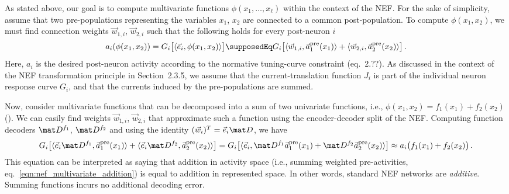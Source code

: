 As stated above, our goal is to compute multivariate functions $\phi(x_1, \ldots, x_\ell)$ within the context of the NEF.
For the sake of simplicity, assume that two pre-populations representing the variables $x_1$, $x_2$ are connected to a common post-population.
To compute $\phi(x_1, x_2)$, we must find connection weights $\vec w_{1, i}$, $\vec w_{2, i}$ such that the following holds for every post-neuron $i$
\begin{align}
	a_i(\phi(x_1, x_2))
		= G_i \bigl[
			\langle \vec e_i, \phi(x_1, x_2) \rangle
		\bigr]
		\supposedEq G_i\bigl[
			\langle \vec w_{1, i}, \vec a^\mathrm{pre}_1(x_1) \rangle + \langle \vec w_{2, i}, \vec a^\mathrm{pre}_2(x_2)
		\rangle\bigr] \,.
	\label{eqn:nef_multivariate_addition}
\end{align}
Here, $a_i$ is the desired post-neuron activity according to the normative tuning-curve constraint (eq.~2.??).
As discussed in the context of the NEF transformation principle in Section~2.3.5, we assume that the current-translation function $J_i$ is part of the individual neuron response curve $G_i$, and that the currents induced by the pre-populations are summed.

Now, consider multivariate functions that can be decomposed into a sum of two univariate functions, i.e., $\phi(x_1, x_2) = f_1(x_1) + f_2(x_2)$ ().
We can easily find weights $\vec w_{1, i}$, $\vec w_{2, i}$ that approximate such a function using the encoder-decoder split of the NEF.
Computing function decoders $\mat D^{f_1}$, $\mat D^{f_2}$ and using the identity $(\vec w_i)^T = \vec e_i \mat D$, we have
\begin{align*}
	G_i\bigl[
	  \langle
	  	\vec e_i \mat D^{f_1},
	  	\vec a^\mathrm{pre}_1(x_1)
	  \rangle
	+ \langle
	  	\vec e_i \mat D^{f_2},
		\vec a^\mathrm{pre}_2(x_2)
	\rangle\bigr] = 
	G_i\bigl[\langle \vec e_i, \mat D^{f_1} \vec a_1^\mathrm{pre}(x_1) + \mat D^{f_2} \vec a_2^\mathrm{pre}(x_2) \rangle\bigr]
	\approx a_i\bigl(f_1(x_1) + f_2(x_2)\bigr) \,.
\end{align*}
This equation can be interpreted as saying that addition in activity space (i.e., summing weighted pre-activities, eq.~\ref{eqn:nef_multivariate_addition}) is equal to addition in represented space.
In other words, standard NEF networks are \emph{additive}.
Summing functions incurs no additional decoding error.


